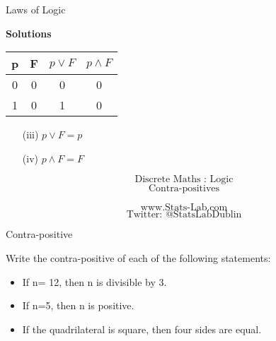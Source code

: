{Laws of Logic}

\textbf{Solutions}
\begin{center}
\begin{tabular}{|c|c||c|c|}
\hline  \phantom{sp}p\phantom{sp}&  \phantom{sp}F\phantom{sp}& $p \vee F$ & $ p \wedge F$ \\ \hline
\hline  0 & 0 & 0 & 0 \\ 
\hline  1 &  0 & 1 & 0 \\ 
\hline 
\end{tabular} 

\end{center}
\begin{itemize}
\item[(iii)] $p \vee F = p $
\item[(iv)] $p \wedge F = F $
\end{itemize}

%
%
%



\[\mbox{Discrete Maths :  Logic}\]
\[\mbox{Contra-positives}\]
\bigskip

\[\mbox{www.Stats-Lab.com}\]
\[\mbox{Twitter: @StatsLabDublin}\]




{Contra-positive}

Write the contra-positive of each of the following statements:

\begin{itemize}
\item If n= 12, then n is divisible by 3.
\item If n=5, then n is positive.
\item If the quadrilateral is square, then four sides are equal.
\end{itemize}


